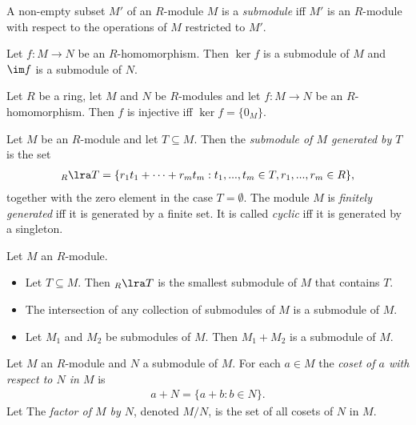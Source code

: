 \documentclass{article}
\begin{document}
\begin{definition}
	A non-empty subset $M'$ of an $R$-module $M$ is a \emph{submodule} iff $M'$ is an
	$R$-module with respect to the operations of $M$ restricted to $M'$.
\end{definition}

\begin{lemma}[Notes 3.7.21]
	Let $f:M\to N$ be an $R$-homomorphism. Then $\ker f$ is a submodule of $M$ and $\im f$
	is a submodule of $N$.
\end{lemma}

\begin{lemma}[Notes 3.7.22]
	Let $R$ be a ring, let $M$ and $N$ be $R$-modules and let $f:M\to N$ be an $R$-homomorphism.
	Then $f$ is injective iff $\ker f =\{0_M\}$.
\end{lemma}

\begin{definition}
	Let $M$ be an $R$-module and let $T\subseteq M$. Then the \emph{submodule of $M$ generated by $T$}
	is the set
	\begin{align*}
		_R\lra T = \{r_1t_1+\cdots+r_mt_m:t_1,...,t_m\in T,r_1,...,r_m\in R\},
	\end{align*}
	together with the zero element in the case $T=\emptyset$. The module $M$ is \emph{finitely generated}
	iff it is generated by a finite set. It is called \emph{cyclic} iff it is generated by a singleton.
\end{definition}

\begin{lemma}[Notes 3.7.28-30]
	Let $M$ an $R$-module.
	\begin{itemize}
		\item Let $T\subseteq M$. Then $_R\lra T$ is the smallest submodule of $M$ that contains $T$.
		\item The intersection of any collection of submodules of $M$ is a submodule of $M$.
		\item Let $M_1$ and $M_2$ be submodules of $M$. Then $M_1+M_2$ is a submodule of $M$.
	\end{itemize}
\end{lemma}

\begin{definition}
	Let $M$ an $R$-module and $N$ a submodule of $M$. For each $a\in M$ the \emph{coset of $a$ with
		respect to $N$ in $M$} is
	\begin{align*}
		a+N=\{a+b:b\in N\}.
	\end{align*}
	Let
	The \emph{factor of $M$ by $N$}, denoted $M/N$, is the set of all cosets of $N$ in $M$.
\end{definition}
\end{document}

